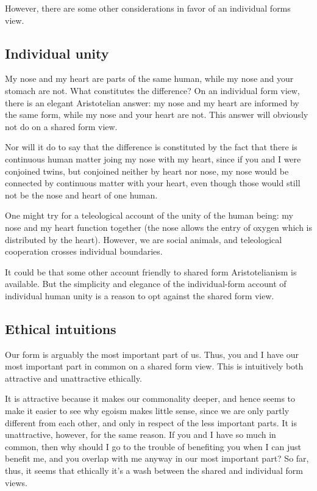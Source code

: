 However, there are some other considerations in favor of an individual forms view.

\subsection{Individual unity}
My nose and my heart are parts of the same human, while my nose and your stomach are not. What constitutes the 
difference? On an individual form view, there is an elegant Aristotelian answer: my nose and my heart are informed by the same
form, while my nose and your heart are not. This answer will obviously not do on a shared form view.

Nor will it do to say that the difference is constituted by the fact that there is continuous human matter joing my nose with my
heart, since if you and I were conjoined twins, but conjoined neither by heart nor nose, my nose would be connected by continuous
matter with your heart, even though those would still not be the nose and heart of one human. 

One might try for a teleological account of the unity of the human being: my nose and my heart function together (the nose 
allows the entry of oxygen which is distributed by the heart). However, we are social animals, and teleological cooperation
crosses individual boundaries.

It could be that some other account friendly to shared form Aristotelianism is available. But the simplicity and elegance of the
individual-form account of individual human unity is a reason to opt against the shared form view.

\subsection{Ethical intuitions}
Our form is arguably the most important part of us. Thus, you and I have our most important
part in common on a shared form view. This is intuitively both attractive and unattractive ethically. 

It is attractive because it makes our commonality deeper, and hence seems to make it easier to see
why egoism makes little sense, since we are only partly different from each other, and only in
respect of the less important parts. It is unattractive, however, for the same reason. If 
you and I have so much in common, then why should I go to the trouble of benefiting you when 
I can just benefit me, and you overlap with me anyway in our most important part? So far, thus,
it seems that ethically it's a wash between the shared and individual form views.

